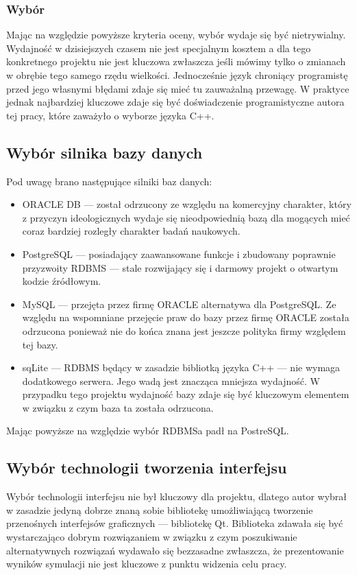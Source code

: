 {\subsubsection{Wybór}
\par{
Mając na względzie powyższe kryteria oceny, wybór wydaje się być nietrywialny. Wydajność w dzisiejszych czasem nie jest specjalnym kosztem a dla tego konkretnego projektu nie jest kluczowa zwłaszcza jeśli mówimy tylko o zmianach w obrębie tego samego rzędu wielkości. Jednocześnie język chroniący programistę przed jego własnymi błędami zdaje się mieć tu zauważalną przewagę. W praktyce jednak najbardziej kluczowe zdaje się być doświadczenie programistyczne autora tej pracy, które zaważyło o wyborze języka C++.
}

\subsection{Wybór silnika bazy danych}
\par{
Pod uwagę brano następujące silniki baz danych:
\begin{itemize}
\item ORACLE DB --- został odrzucony ze względu na komercyjny charakter, który z przyczyn ideologicznych wydaje się nieodpowiednią bazą dla mogących mieć coraz bardziej rozległy charakter badań naukowych.
\item PostgreSQL --- posiadający zaawansowane funkcje i zbudowany poprawnie przyzwoity RDBMS --- stale rozwijający się i darmowy projekt o otwartym kodzie źródłowym.
\item MySQL --- przejęta przez firmę ORACLE alternatywa dla PostgreSQL. Ze względu na wspomniane przejęcie praw do bazy przez firmę ORACLE została odrzucona ponieważ nie do końca znana jest jeszcze polityka firmy względem tej bazy.
\item sqLite --- RDBMS będący w zasadzie bibliotką języka C++ --- nie wymaga dodatkowego serwera. Jego wadą jest znacząca mniejsza wydajność. W przypadku tego projektu wydajność bazy zdaje się być kluczowym elementem w związku z czym baza ta została odrzucona.
\end{itemize}
Mając powyższe na względzie wybór RDBMSa padł na PostreSQL.
}

\subsection{Wybór technologii tworzenia interfejsu}
\par{
Wybór technologii interfejsu nie był kluczowy dla projektu, dlatego autor wybrał w zasadzie jedyną dobrze znaną sobie bibliotekę umożliwiającą tworzenie przenośnych interfejsów graficznych --- bibliotekę Qt. Biblioteka zdawała się być wystarczająco dobrym rozwiązaniem w związku z czym poszukiwanie alternatywnych rozwiązań wydawało się bezzasadne zwłaszcza, że prezentowanie wyników symulacji nie jest kluczowe z punktu widzenia celu pracy.
}

}

